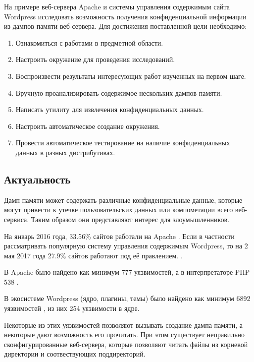 \documentclass[20pt]{article}
\begin{document}
На примере веб-сервера Apache и системы управления содержимым сайта Wordpress
исследовать возможность получения конфиденциальной информации из дампов памяти
веб-сервера. Для достижения поставленной цели необходимо:

\begin{enumerate}
  \item Ознакомиться с работами в предметной области.
  \item Настроить окружение для проведения исследований.
  \item Воспроизвести результаты интересующих работ изученных на первом шаге.
  \item Вручную проанализировать содержимое нескольких дампов памяти.
  \item Написать утилиту для извлечения конфиденциальных данных.
  \item Настроить автоматическое создание окружения.
  \item Провести автоматическое тестирование на наличие конфиденциальных данных
  в разных дистрибутивах.
\end{enumerate}

\newpage

\subsection{Актуальность}

Дамп памяти может содержать различные конфиденциальные данные, которые могут
привести к утечке пользовательских данных или компометации всего веб-сервиса.
Таким образом они представляют интерес для злоумышленников.

На январь 2016 года, 33.56\% сайтов работали на Apache \cite{number_of_apache_sites}.
Если в частности рассматривать популярную систему управления содержимым Wordpress,
то на 2 мая 2017 года 27.9\% сайтов работают под её правлением. \cite{number_of_wordpress_sites}.

В Apache было найдено как минимум 777 \cite{apache/vulnerabilities-list} уязвимостей,
а в интерпретаторе PHP 538 \cite{php/vulnerabilities-list}.

В экосистеме Wordpress (ядро, плагины, темы) было найдено как минимум 6892
уязвимостей \cite{wordpress/vulnerablilities-list-all}, из них 254
уязвимости \cite{wordpress/vulnerabilities-list-core} в ядре.

Некоторые из этих уязвимостей позволяют вызывать создание дампа памяти, а
некоторые дают возможность его прочитать. При этом существует неправильно
сконфигурированные веб-сервера, которые позволяют читать файлы из корневой
директории и соотвествующих поддиректорий.
\end{document}
